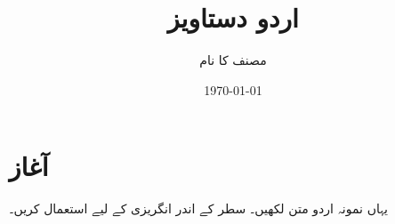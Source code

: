 \documentclass[11pt,a4paper]{article}
\title{اردو دستاویز}
\author{مصنف کا نام}
\date{\today}
\begin{document}
\maketitle
\section{آغاز}
یہاں نمونہ اردو متن لکھیں۔ سطر کے اندر انگریزی کے لیے  استعمال کریں۔
\end{document}

